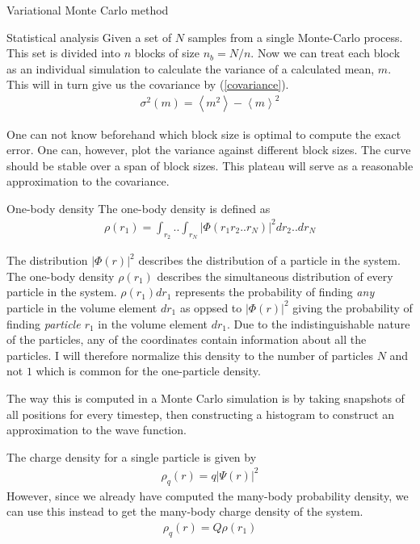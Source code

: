 \documentclass[a4paper, 12pt, titlepage]{article}
\begin{document}
\begin{section}{Variational Monte Carlo method}
\begin{subsection}{Statistical analysis}
 Given a set of $N$ samples from a single Monte-Carlo process. This set is divided into $n$ blocks of size $n_b = N/n$. Now we can treat each block as an individual simulation to calculate the variance of a calculated mean, $m$. This will in turn give us the covariance by (\ref{covariance}).
 \begin{align*}
 	\sigma^2 (m) = \left<m^2\right> - \left<m\right>^2 
 \end{align*}

 One can not know beforehand which block size is optimal to compute the exact error. One can, however, plot the variance against different block sizes. The curve should be stable over a span of block sizes. This plateau will serve as a reasonable approximation to the covariance. 
 \end{subsection}
 \begin{subsection}{One-body density}
 	The one-body density is defined as
 \begin{align*}
 	\rho(r_1) = \int_{r_2} .. \int_{r_N} | \Phi(r_1 r_2 .. r_N) |^2 dr_2 .. dr_N
 \end{align*}

 The distribution $|\Phi(r)|^2$ describes the distribution of a particle in the system. The one-body density $\rho(r_1)$ describes the simultaneous distribution of every particle in the system. $\rho(r_1) dr_1 $ represents the probability of finding \textit{any} particle in the volume element $dr_1$ as oppsed to $|\Phi(r)|^2$ giving the probability of finding \textit{particle $r_1$} in the volume element $dr_1$. Due to the indistinguishable nature of the particles, any of the coordinates contain information about all the particles. I will therefore normalize this density to the number of particles $N$ and not $1$ which is common for the one-particle density. 

 The way this is computed in a Monte Carlo simulation is by taking snapshots of all positions for every timestep, then constructing a histogram to construct an approximation to the wave function.

 The charge density for a single particle is given by 
 \begin{align*}
 	\rho_q (r) = q |\Psi(r)|^2
 \end{align*}
 However, since we already have computed the many-body probability density, we can use this instead to get the many-body charge density of the system. 
 \begin{align*}
 	\rho_q (r) = Q \rho(r_1)
 \end{align*}
 \end{subsection}


\end{section}
\end{document}
